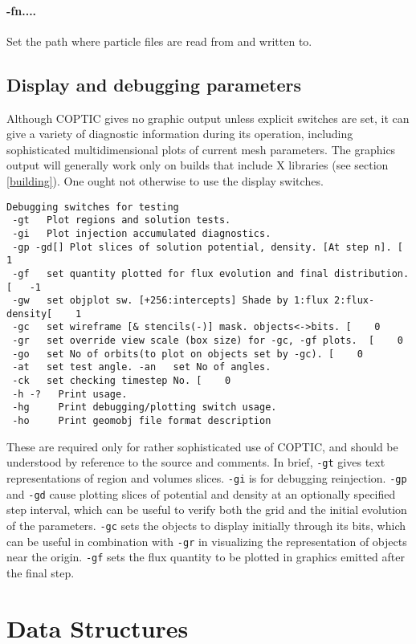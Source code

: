 \documentclass[12pt]{article}
\begin{document}
\paragraph{-fn....} Set the path where particle files are read from
and written to.

\subsection{Display and debugging parameters}

Although COPTIC gives no graphic output unless explicit switches are
set, it can give a variety of diagnostic information during its
operation, including sophisticated multidimensional plots of current
mesh parameters.  The graphics output will generally work only on
builds that include X libraries (see section \ref{building}). One
ought not otherwise to use the display switches.

\begin{verbatim}
Debugging switches for testing
 -gt   Plot regions and solution tests.
 -gi   Plot injection accumulated diagnostics.
 -gp -gd[] Plot slices of solution potential, density. [At step n]. [    1
 -gf   set quantity plotted for flux evolution and final distribution. [   -1
 -gw   set objplot sw. [+256:intercepts] Shade by 1:flux 2:flux-density[    1
 -gc   set wireframe [& stencils(-)] mask. objects<->bits. [    0
 -gr   set override view scale (box size) for -gc, -gf plots.  [    0
 -go   set No of orbits(to plot on objects set by -gc). [    0
 -at   set test angle. -an   set No of angles. 
 -ck   set checking timestep No. [    0
 -h -?   Print usage.
 -hg     Print debugging/plotting switch usage.
 -ho     Print geomobj file format description
\end{verbatim}
These are required only for rather sophisticated use of COPTIC, and
should be understood by reference to the source and comments. In
brief, \verb!-gt! gives text representations of region and volumes
slices. \verb!-gi! is for debugging reinjection. \verb!-gp! and
\verb!-gd! cause plotting slices of potential and density at an
optionally specified step interval, which can be useful to verify both
the grid and the initial evolution of the parameters. \verb!-gc! sets
the objects to display initially through its bits, which can be useful
in combination with \verb!-gr! in visualizing the representation of
objects near the origin. \verb!-gf! sets the
flux quantity to be plotted in graphics emitted after the final step.

\section{Data Structures}
\end{document}
